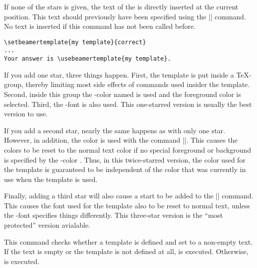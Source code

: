 \begin{command}{\usebeamertemplate\opt{|***|}}
  If none of the stars is given, the text of the 
  is directly inserted at the current position. This text should
  previously have been specified using the |\setbeamertemplate|
  command. No text is inserted if this command has not been called
  before.
  \example
\begin{verbatim}
\setbeamertemplate{my template}{correct}
...
Your answer is \usebeamertemplate{my template}.
\end{verbatim}

  If you add one star, three things happen. First, the template is put
  inside a \TeX-group, thereby limiting most side effects of commands
  used insider the template. Second, inside this group the
  \beamer-color named  is used and the foreground
  color is selected. Third, the \beamer-font  is
  also used. This one-starred version is usually the best version to
  use.

  If you add a second star, nearly the same happens as with only one
  star. However, in addition, the color is used with the command
  |\setbeamercolor*|. This causes the colors to be reset to the normal
  text color if no special foreground or background is specified by
  the \beamer-color . Thus, in this twice-starred
  version, the color used for the template is guaranteed to be
  independent of the color that was currently in use when the template
  is used.

  Finally, adding a third star will also cause a start to be added to
  the |\setbeamerfont*| command. This causes the font used for the
  template also to be reset to normal text, unless the \beamer-font
   specifies things differently. This three-star
  version is the ``most protected'' version avialable.
\end{command}

\begin{command}{\ifbeamertemplateempty{}}
  This command checks whether a template is defined and set to a    
  non-empty text. If the text is empty or the template is not
  defined at all,  is executed. Otherwise,
   is executed. 
\end{command}


